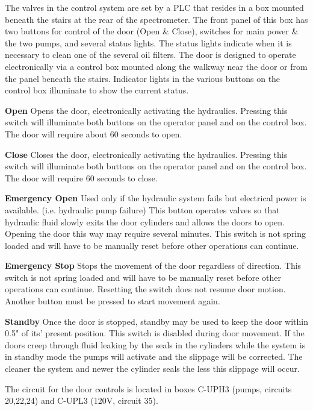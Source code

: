 The valves in the control system are set by a PLC that resides in a box
mounted beneath the stairs at the rear of the spectrometer. The front panel
of this box has two buttons for control of the door (Open \& Close),
switches for main power \& the two pumps, and several status lights. The
status lights indicate when it is necessary to clean one of the several oil
filters. The door is designed to operate electronically via a control box
mounted along the walkway near the door or from the panel beneath the
stairs. Indicator lights in the various buttons on the control box
illuminate to show the current status.

\begin{description}
\item{\bf Open} Opens the door, electronically activating the hydraulics.
Pressing this switch will illuminate both buttons on the operator panel and
on the
control box. The door will require about 60 seconds to open.
\item{\bf Close} Closes the door, electronically activating the hydraulics.
Pressing this switch will illuminate both buttons on the operator panel and on
the control box. The door will require 60 seconds to close.
\item{\bf Emergency Open} Used only if the hydraulic system fails but electrical
power is available. (i.e. hydraulic pump failure) This button operates
valves so that hydraulic fluid slowly exits the door cylinders and allows the
doors to open. Opening the door this way may require several minutes.
This switch is not spring loaded and will have to be manually reset before
other operations can continue.
\item{\bf Emergency Stop} Stops the movement of the door regardless of
direction.
This switch is not spring loaded and will have to be manually reset before
other operations can continue. Resetting the switch does not resume door
motion. Another button must be pressed to start movement again.
\item{\bf Standby} Once the door is stopped, standby may be used to keep
the door
within 0.5" of its' present position. This switch is disabled during door
movement. If the doors creep through fluid leaking by the seals in the
cylinders while the system is in standby mode the pumps will activate and the
slippage will be corrected. The cleaner the system and newer the cylinder
seals the less this slippage will occur.
\end{description}

The circuit for the door controls is located in boxes C-UPH3 (pumps, circuits
20,22,24) and C-UPL3 (120V, circuit 35).

